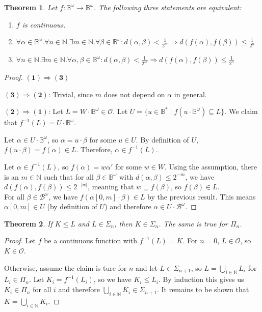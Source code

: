 \documentclass{article}
\newtheorem{theorem}{Theorem}
\begin{document}
\begin{theorem}
	Let $f : \mathbb{B}^\omega \rightarrow \mathbb{B}^\omega$. The following three statements are equivalent:
	\begin{enumerate}
		\item $f$ is continuous.
		\item $\forall \alpha \in \mathbb{B}^\omega. \forall n \in \mathbb{N}. \exists m \in \mathbb{N}. \forall \beta \in \mathbb{B}^\omega : d(\alpha, \beta) < \frac{1}{2^m} \Rightarrow d(f(\alpha), f(\beta)) \leq \frac{1}{2^n}$
		\item $\forall n \in \mathbb{N}. \exists m \in \mathbb{N}. \forall \alpha, \beta \in \mathbb{B}^\omega : d(\alpha, \beta) < \frac{1}{2^m} \Rightarrow d(f(\alpha), f(\beta)) \leq \frac{1}{2^n}$
	\end{enumerate}
\end{theorem}
\begin{proof}
	$\boldsymbol{(1) \Rightarrow (3)}$ %
	
	$\boldsymbol{(3) \Rightarrow (2)}$: Trivial, since $m$ does not depend on $\alpha$ in general.
	
	$\boldsymbol{(2) \Rightarrow (1)}$: Let $L = W \cdot \mathbb{B}^\omega \in \mathcal{O}$. Let $U = \{ u \in \mathbb{B}^* \mid f(u \cdot \mathbb{B}^\omega) \subseteq L \}$. We claim that $f^{-1}(L) = U \cdot \mathbb{B}^\omega$.
	
	Let $\alpha \in U \cdot \mathbb{B}^\omega$, so $\alpha = u \cdot \beta$ for some $u \in U$. By definition of $U$, $f(u \cdot \beta) = f(\alpha) \in L$. Therefore, $\alpha \in f^{-1}(L)$.
	
	Let $\alpha \in f^{-1}(L)$, so $f(\alpha) = w \alpha'$ for some $w \in W$. Using the assumption, there is an $m \in \mathbb{N}$ such that for all $\beta \in \mathbb{B}^\omega$ with $d(\alpha, \beta) \leq 2^{-m}$, we have $d(f(\alpha), f(\beta)) \leq 2^{-|w|}$, meaning that $w \sqsubseteq f(\beta)$, so $f(\beta) \in L$. \\
	For all $\beta \in \mathcal{B}^\omega$, we have $f(\alpha[0,m] \cdot \beta) \in L$ by the previous result. This means $\alpha[0,m] \in U$ (by definition of $U$) and therefore $\alpha \in U \cdot \mathcal{B}^\omega$.
\end{proof}

\begin{theorem}
	If $K \leq L$ and $L \in \Sigma_n$, then $K \in \Sigma_n$. The same is true for $\Pi_n$.
\end{theorem}
\begin{proof}
	Let $f$ be a continuous function with $f^{-1}(L) = K$. For $n = 0$, $L \in \mathcal{O}$, so $K \in \mathcal{O}$.
	
	Otherwise, assume the claim is ture for $n$ and let $L \in \Sigma_{n+1}$, so $L = \bigcup\limits_{i \in \mathbb{N}} L_i$ for $L_i \in \Pi_n$. Let $K_i = f^{-1}(L_i)$, so we have $K_i \leq L_i$. By induction this gives us $K_i \in \Pi_n$ for all $i$ and therefore $\bigcup\limits_{i \in \mathbb{N}} K_i \in \Sigma_{n+1}$. It remains to be shown that $K = \bigcup\limits_{i \in \mathbb{N}} K_i$. %
\end{proof}
\end{document}
